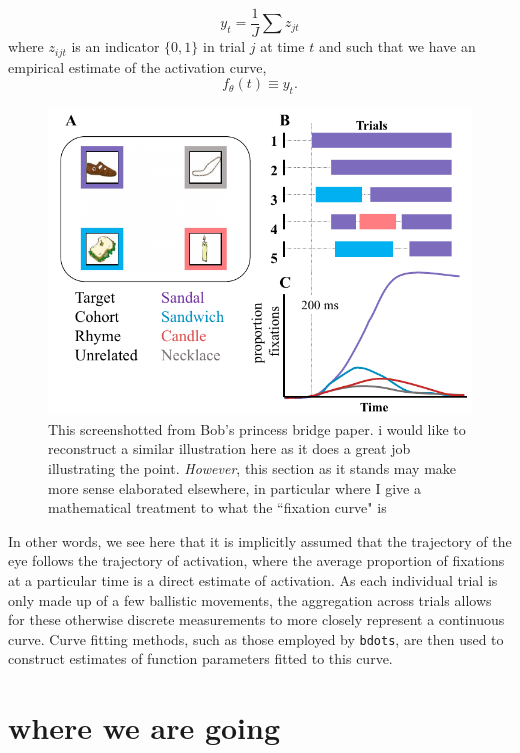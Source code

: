 \documentclass{article}
\newcommand{\xt}{\texttt}%
\begin{document}
\begin{equation}
y_{t} = \frac1J \sum z_{jt}
\end{equation}
where $z_{ijt}$ is an indicator $\{0, 1\}$ in trial $j$ at time $t$ and such that we have an empirical estimate of the activation curve,
\begin{equation}
f_{\theta}(t) \equiv y_t.
\end{equation}


\begin{figure}
\centering
\includegraphics[scale=0.45]{bob_vwp_full.png}
\caption{This screenshotted from Bob's princess bridge paper. i would like to reconstruct a similar illustration here as it does a great job illustrating the point. \textit{However}, this section as it stands may make more sense elaborated elsewhere, in particular where I give a mathematical treatment to what the ``fixation curve" is}
\label{fig:bob_diagram_full}
\end{figure}

In other words, we see here that it is implicitly assumed that the trajectory of the eye follows the trajectory of activation, where the average proportion of fixations at a particular time is a direct estimate of activation. As each individual trial is only made up of a few ballistic movements, the aggregation across trials allows for these otherwise discrete measurements to more closely represent a continuous curve. Curve fitting methods, such as those employed by \xt{bdots}, are then used to construct estimates of function parameters fitted to this curve.


\section{where we are going} 
\end{document}
